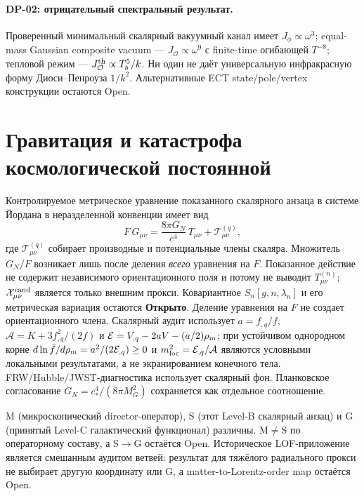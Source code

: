 \documentclass[11pt,a4paper]{article}
\newcommand{\statO}{\textbf{Открыто}}
\begin{document}
\paragraph{DP-02: отрицательный спектральный результат.}
Проверенный минимальный скалярный вакуумный канал имеет
$J_\phi\propto\omega^3$; equal-mass Gaussian composite vacuum —
$J_{\mathcal O}\propto\omega^9$ с finite-time огибающей $T^{-8}$; тепловой
режим — $J_{\mathcal O}^{\rm th}\propto T_b^5/k$. Ни один не даёт
универсальную инфракрасную форму Диоси--Пенроуза $1/k^2$. Альтернативные
ECT state/pole/vertex конструкции остаются Open.

\section{Гравитация и катастрофа космологической постоянной}
\label{sec:gravity}

Контролируемое метрическое уравнение показанного
скалярного анзаца в системе Йордана в неразделенной конвенции имеет вид
\begin{equation}
  \label{eq:gee}
  F\,G_{\mu\nu}
  = \frac{8\pi G_N}{c^4}\,T_{\mu\nu}
    + \mathcal{T}^{(q)}_{\mu\nu},
\end{equation}
где $\mathcal{T}^{(q)}_{\mu\nu}$ собирает производные и
потенциальные члены скаляра.  Множитель $G_N/F$ возникает лишь
после деления \emph{всего} уравнения на $F$.  Показанное действие не
содержит независимого ориентационного поля и потому не выводит
$T^{(n)}_{\mu\nu}$; $\mathcal X^{\rm cand}_{\mu\nu}$ является только
внешним прокси.  Ковариантное $S_n[g,n,\lambda_n]$ и его метрическая
вариация остаются \statO.  Деление уравнения на $F$ не создает
ориентационного члена.  Скалярный аудит использует
$a=f_{,q}/f$, $\mathcal A=K+3f_{,q}^2/(2f)$ и
$\mathcal E=V_{,q}-2aV-(a/2)\rho_{\rm m}$; при устойчивом однородном
корне $d\ln\bar f/d\rho_{\rm m}=a^2/(2\mathcal E_{,q})\ge0$ и
$m_{\rm loc}^2=\mathcal E_{,q}/\mathcal A$ являются условными локальными
результатами, а не экранированием конечного тела.
FRW/Hubble/JWST-диагностика использует скалярный фон.  Планковское согласование
$G_N=c_*^4/(8\pi M_G^2)$ сохраняется как отдельное соотношение.

M (микроскопический director-оператор), S (этот Level-B скалярный анзац) и G (принятый Level-C галактический функционал) различны. M$\neq$S по операторному составу, а S$\to$G остаётся Open. Историческое LOF-приложение является смешанным аудитом ветвей: результат для тяжёлого радиального прокси не выбирает другую координату или G, а matter-to-Lorentz-order map остаётся Open.
\end{document}

